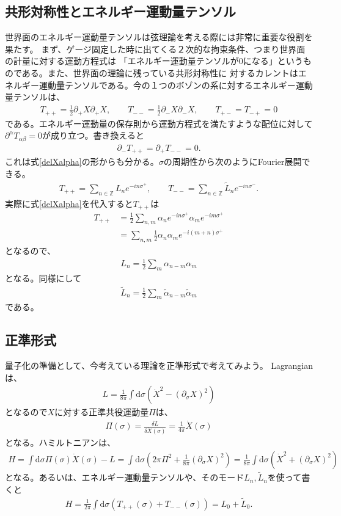 \documentclass[report,paper=a4, fontsize=12pt, line_length=16cm, number_of_lines=33,dvipdfmx]{jlreq}
\numberwithin{equation}{chapter}
\numberwithin{equation}{section}
\newcommand{\Zb}{\mathbb{Z}}
\newcommand{\del}{\partial}
\newcommand{\alphat}{\tilde{\alpha}}
\newcommand{\Lt}{\widetilde{L}}
\newcommand{\di}{\mathrm{d}}
\begin{document}
\subsection{共形対称性とエネルギー運動量テンソル}
世界面のエネルギー運動量テンソルは弦理論を考える際には非常に重要な役割を果たす。
まず、ゲージ固定した時に出てくる２次的な拘束条件、つまり世界面の計量に対する運動方程式は
「エネルギー運動量テンソルが$0$になる」というものである。また、世界面の理論に残っている共形対称性に
対するカレントはエネルギー運動量テンソルである。今の１つのボゾンの系に対するエネルギー運動量テンソルは、
\begin{align}
T_{++}=\frac12 \del_{+}X\del_{+}X,\qquad
T_{--}=\frac12 \del_{-}X\del_{-}X,\qquad
T_{+-}=T_{-+}=0\label{free-scalar-EM}
\end{align}
である。エネルギー運動量の保存則から運動方程式を満たすような配位に対して$\del^{\alpha}T_{\alpha\beta}=0$が成り立つ。書き換えると
\begin{align}
\del_{-}T_{++}=\del_{+}T_{--}=0.
\end{align}
これは式\eqref{delXalpha}の形からも分かる。$\sigma$の周期性から次のようにFourier展開できる。
\begin{align}
T_{++}=\sum_{n\in\Zb}L_{n}e^{-in\sigma^{+}},\qquad
T_{--}=\sum_{n\in\Zb}\Lt_{n}e^{-in\sigma^{-}}.
\end{align}
実際に式\eqref{delXalpha}を代入すると$T_{++}$は
\begin{align}
T_{++}&=\frac12 \sum_{n,m}\alpha_n e^{-in\sigma^{+}}\alpha_m e^{-im\sigma^{+}}\\
&=\sum_{n,m}\frac12 \alpha_n\alpha_m e^{-i(m+n)\sigma^{+}}
\end{align}
となるので、
\begin{align}
L_{n}=\frac12 \sum_{m} \alpha_{n-m}\alpha_{m}
\end{align}
となる。同様にして
\begin{align}
\Lt_{n}=\frac12 \sum_{m} \alphat_{n-m}\alphat_{m}
\end{align}
である。
\subsection{正準形式}
量子化の準備として、今考えている理論を正準形式で考えてみよう。
Lagrangianは、
\begin{align}
L=\frac{1}{8\pi}\int \di \sigma \left(\dot{X}^2-(\del_{\sigma}X)^2\right)
\end{align}
となるので$X$に対する正準共役運動量$\Pi$は、
\begin{align}
\Pi(\sigma)=\frac{\delta L}{\delta \dot{X}(\sigma)}=\frac{1}{4\pi} \dot{X}(\sigma)
\end{align}
となる。ハミルトニアンは、
\begin{align}
H=\int \di \sigma \Pi(\sigma) \dot {X} (\sigma)-L
=\int \di \sigma (2\pi \Pi^2+\frac{1}{8\pi} (\del_{\sigma}X)^2)
=\frac{1}{8\pi}\int \di \sigma (\dot{X}^2+(\del_{\sigma}X)^2)
\end{align}
となる。あるいは、エネルギー運動量テンソルや、そのモード$L_n,\Lt_n$を使って書くと
\begin{align}
H=\frac{1}{2\pi}\int \di \sigma (T_{++}(\sigma)+T_{--}(\sigma))=L_0+\Lt_0.\label{CFT-Hamiltonial}
\end{align}
\end{document}
